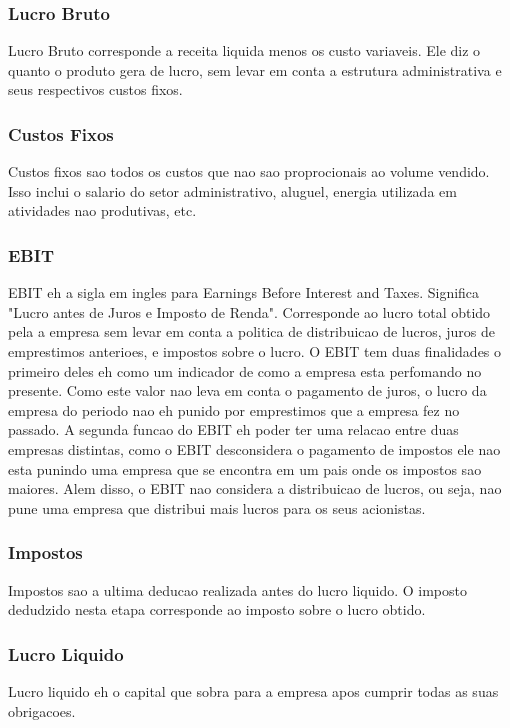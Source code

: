 \documentclass[12pt]{article}
\begin{document}
\subsubsection{Lucro Bruto}
Lucro Bruto corresponde a receita liquida menos os custo variaveis. Ele diz o quanto o produto gera de lucro, sem levar em conta a estrutura administrativa e seus respectivos custos fixos.

\subsubsection{Custos Fixos}
Custos fixos sao todos os custos que nao sao proprocionais ao volume vendido. Isso inclui o salario do setor administrativo, aluguel, energia utilizada em atividades nao produtivas, etc.

\subsubsection{EBIT}
EBIT eh a sigla em ingles para Earnings Before Interest and Taxes. Significa "Lucro antes de Juros e Imposto de Renda". Corresponde ao lucro total obtido pela a empresa sem levar em conta a politica de distribuicao de lucros, juros de emprestimos anterioes, e impostos sobre o lucro. O EBIT tem duas finalidades o primeiro deles eh como um indicador de como a empresa esta perfomando no presente. Como este valor nao leva em conta o pagamento de juros, o lucro da empresa do periodo nao eh punido por emprestimos que a empresa fez no passado. A segunda funcao do EBIT eh poder ter uma relacao entre duas empresas distintas, como o EBIT desconsidera o pagamento de impostos ele nao esta punindo uma empresa que se encontra em um pais onde os impostos sao maiores. Alem disso, o EBIT nao considera a distribuicao de lucros, ou seja, nao pune uma empresa que distribui mais lucros para os seus acionistas.

\subsubsection{Impostos}
Impostos sao a ultima deducao realizada antes do lucro liquido. O imposto dedudzido nesta etapa corresponde ao imposto sobre o lucro obtido.

\subsubsection{Lucro Liquido}
Lucro liquido eh o capital que sobra para a empresa apos cumprir todas as suas obrigacoes.
\end{document}
